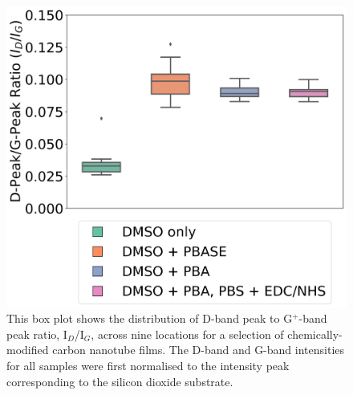 \documentclass[
  a4paper,
]{scrbook}
\begin{document}
\begin{figure}

{\centering \includegraphics{figures/ch7/comparison_raman.png}

}

\caption{\label{fig-linker-raman}This box plot shows the distribution of
D-band peak to G\(^+\)-band peak ratio, I\(_D\)/I\(_G\), across nine
locations for a selection of chemically-modified carbon nanotube films.
The D-band and G-band intensities for all samples were first normalised
to the intensity peak corresponding to the silicon dioxide substrate.}

\end{figure}
\end{document}

